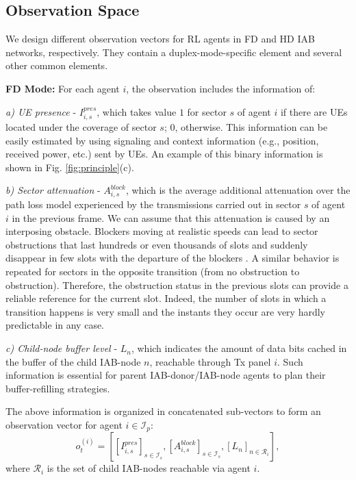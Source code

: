 \vspace{-7pt}
\subsection{Observation Space}
\vspace{-3pt}

We design different observation vectors for RL agents in FD and HD IAB networks, respectively.
They contain a duplex-mode-specific element and several other common elements.

\textbf{FD Mode:}
For each agent $i$, the observation includes the information of:

\noindent\emph{a) UE presence} - $I^{pres}_{i, s}$, which takes value $1$ for sector $s$ of agent $i$ if there are UEs located under the coverage of sector $s$; $0$, otherwise. This information can be easily estimated by using signaling and context information (e.g., position, received power, etc.) sent by UEs. An example of this binary information is shown in Fig. \ref{fig:principle}(c).

\noindent\emph{b) Sector attenuation} - $A^{block}_{i, s}$, which is the average additional attenuation over the path loss model experienced by the transmissions carried out in sector $s$ of agent $i$ in the previous frame. We can assume that this attenuation is caused by an interposing obstacle.
Blockers moving at realistic speeds can lead to sector obstructions
that last hundreds or even thousands of slots and suddenly disappear in few slots with the departure of the blockers \cite{maccartney2017rapid}. A similar behavior is repeated for sectors in the opposite transition (from no obstruction to obstruction). Therefore, the obstruction status in the previous slots can provide a reliable reference for the current slot. Indeed, the number of slots in which a transition happens is very small and the instants they occur are very hardly predictable in any case.
	
\noindent\emph{c) Child-node buffer level} - $L_n$, which indicates the amount of data bits cached in the buffer of the child IAB-node $n$, reachable through Tx panel $i$.
Such information is essential for parent IAB-donor/IAB-node agents to plan their buffer-refilling strategies.

The above information is organized in concatenated sub-vectors to form an observation vector for agent $i \in \mathcal{I}_p$:
\begin{equation}
	o^{(i)}_t = {[[I^{pres}_{i, s}]_{s \in \mathcal{I}_s}, [A^{block}_{i, s}]_{s \in \mathcal{I}_s}, [L_n]_{n \in \mathcal{R}_i}]},
	\label{observation}
\end{equation}
where $\mathcal{R}_i$ is the set of child IAB-nodes reachable via agent $i$.

